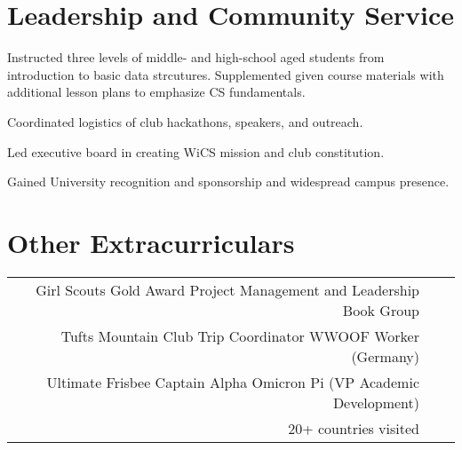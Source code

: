 \documentclass[]{csaund-resume}
\begin{document}
\begin{minipage}[t]{0.66\textwidth}

\section{Leadership and Community Service}
Instructed three levels of middle- and high-school aged students from introduction to basic data strcutures. Supplemented given course materials with additional lesson plans to emphasize CS fundamentals.
\sectionsep

\begin{tightemize}
\item Coordinated logistics of club hackathons, speakers, and outreach.
\item Led executive board in creating WiCS mission and club constitution.
\item Gained University recognition and sponsorship and widespread campus presence.
\end{tightemize}
\sectionsep


\section{Other Extracurriculars}
\begin{tabular}{rll}
 Girl Scouts Gold Award \textbullet{} Project Management and Leadership Book Group \\
 \textbullet{} Tufts Mountain Club Trip Coordinator \textbullet{} WWOOF Worker (Germany) \\ 
 \textbullet{} Ultimate Frisbee Captain \textbullet{} Alpha Omicron Pi (VP Academic Development) \\
 \textbullet{} 20+ countries visited
\end{tabular}
\sectionsep

\end{minipage}
\end{document}
